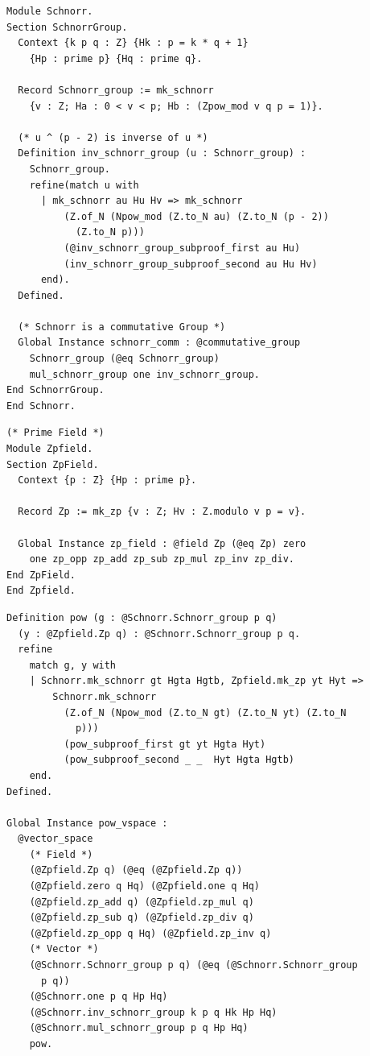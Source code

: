 \begin{lstlisting}[frame=single, language=Coq, caption={Rocq Encoding of the Schnorr Group},
  label={group_def},captionpos=t, basicstyle=\ttfamily\scriptsize,
  abovecaptionskip=-\medskipamount]
Module Schnorr.
Section SchnorrGroup. 
  Context {k p q : Z} {Hk : p = k * q + 1}
    {Hp : prime p} {Hq : prime q}.

  Record Schnorr_group := mk_schnorr 
    {v : Z; Ha : 0 < v < p; Hb : (Zpow_mod v q p = 1)}.

  (* u ^ (p - 2) is inverse of u *)
  Definition inv_schnorr_group (u : Schnorr_group) :
    Schnorr_group.
    refine(match u with 
      | mk_schnorr au Hu Hv => mk_schnorr
          (Z.of_N (Npow_mod (Z.to_N au) (Z.to_N (p - 2))
            (Z.to_N p)))
          (@inv_schnorr_group_subproof_first au Hu)
          (inv_schnorr_group_subproof_second au Hu Hv)
      end).
  Defined.

  (* Schnorr is a commutative Group *)
  Global Instance schnorr_comm : @commutative_group 
    Schnorr_group (@eq Schnorr_group) 
    mul_schnorr_group one inv_schnorr_group.
End SchnorrGroup.
End Schnorr.
\end{lstlisting}

\begin{lstlisting}[frame=single, language=Coq, caption={Rocq Encoding of Prime Field},
  label={field_def},captionpos=t, basicstyle=\ttfamily\scriptsize,
  abovecaptionskip=-\medskipamount]
(* Prime Field *)
Module Zpfield.
Section ZpField.
  Context {p : Z} {Hp : prime p}.

  Record Zp := mk_zp {v : Z; Hv : Z.modulo v p = v}.

  Global Instance zp_field : @field Zp (@eq Zp) zero 
    one zp_opp zp_add zp_sub zp_mul zp_inv zp_div.
End ZpField. 
End Zpfield.
\end{lstlisting}

\begin{lstlisting}[frame=single, language=Coq, caption={Vector Space Instantiation},
  label={vec_space},captionpos=t, basicstyle=\ttfamily\scriptsize,
  abovecaptionskip=-\medskipamount]
Definition pow (g : @Schnorr.Schnorr_group p q) 
  (y : @Zpfield.Zp q) : @Schnorr.Schnorr_group p q.
  refine 
    match g, y with 
    | Schnorr.mk_schnorr gt Hgta Hgtb, Zpfield.mk_zp yt Hyt => 
        Schnorr.mk_schnorr  
          (Z.of_N (Npow_mod (Z.to_N gt) (Z.to_N yt) (Z.to_N
            p))) 
          (pow_subproof_first gt yt Hgta Hyt)
          (pow_subproof_second _ _  Hyt Hgta Hgtb)
    end.
Defined.

Global Instance pow_vspace : 
  @vector_space 
    (* Field *)
    (@Zpfield.Zp q) (@eq (@Zpfield.Zp q))
    (@Zpfield.zero q Hq) (@Zpfield.one q Hq)
    (@Zpfield.zp_add q) (@Zpfield.zp_mul q)
    (@Zpfield.zp_sub q) (@Zpfield.zp_div q)
    (@Zpfield.zp_opp q Hq) (@Zpfield.zp_inv q)
    (* Vector *)
    (@Schnorr.Schnorr_group p q) (@eq (@Schnorr.Schnorr_group
      p q))
    (@Schnorr.one p q Hp Hq) 
    (@Schnorr.inv_schnorr_group k p q Hk Hp Hq)
    (@Schnorr.mul_schnorr_group p q Hp Hq)
    pow.
\end{lstlisting}

